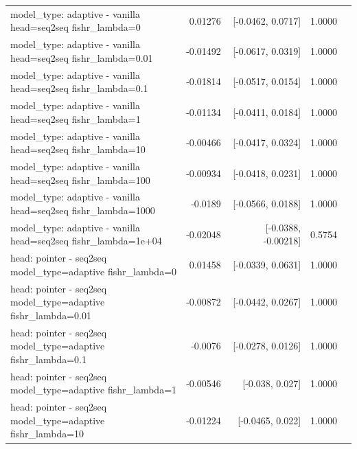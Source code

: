 \documentclass[10pt]{article}
\makeatletter
\newcommand{\stackcell}[1]{\begin{tabular}[t]{@{}l@{}}#1\end{tabular}}
\makeatother
\begin{document}
{\begin{longtable}{lrrrl}
\stackcell{model\_type: adaptive - vanilla\\\footnotesize head=seq2seq fishr\_lambda=0 } & 0.01276 & [-0.0462, 0.0717] & 1.0000 & \\
\stackcell{model\_type: adaptive - vanilla\\\footnotesize head=seq2seq fishr\_lambda=0.01 } & -0.01492 & [-0.0617, 0.0319] & 1.0000 & \\
\stackcell{model\_type: adaptive - vanilla\\\footnotesize head=seq2seq fishr\_lambda=0.1 } & -0.01814 & [-0.0517, 0.0154] & 1.0000 & \\
\stackcell{model\_type: adaptive - vanilla\\\footnotesize head=seq2seq fishr\_lambda=1 } & -0.01134 & [-0.0411, 0.0184] & 1.0000 & \\
\stackcell{model\_type: adaptive - vanilla\\\footnotesize head=seq2seq fishr\_lambda=10 } & -0.00466 & [-0.0417, 0.0324] & 1.0000 & \\
\stackcell{model\_type: adaptive - vanilla\\\footnotesize head=seq2seq fishr\_lambda=100 } & -0.00934 & [-0.0418, 0.0231] & 1.0000 & \\
\stackcell{model\_type: adaptive - vanilla\\\footnotesize head=seq2seq fishr\_lambda=1000 } & -0.0189 & [-0.0566, 0.0188] & 1.0000 & \\
\stackcell{model\_type: adaptive - vanilla\\\footnotesize head=seq2seq fishr\_lambda=1e+04 } & -0.02048 & [-0.0388, -0.00218] & 0.5754 & \\
\stackcell{head: pointer - seq2seq\\\footnotesize model\_type=adaptive fishr\_lambda=0 } & 0.01458 & [-0.0339, 0.0631] & 1.0000 & \\
\stackcell{head: pointer - seq2seq\\\footnotesize model\_type=adaptive fishr\_lambda=0.01 } & -0.00872 & [-0.0442, 0.0267] & 1.0000 & \\
\stackcell{head: pointer - seq2seq\\\footnotesize model\_type=adaptive fishr\_lambda=0.1 } & -0.0076 & [-0.0278, 0.0126] & 1.0000 & \\
\stackcell{head: pointer - seq2seq\\\footnotesize model\_type=adaptive fishr\_lambda=1 } & -0.00546 & [-0.038, 0.027] & 1.0000 & \\
\stackcell{head: pointer - seq2seq\\\footnotesize model\_type=adaptive fishr\_lambda=10 } & -0.01224 & [-0.0465, 0.022] & 1.0000 & \\

\end{longtable}}
\end{document}
